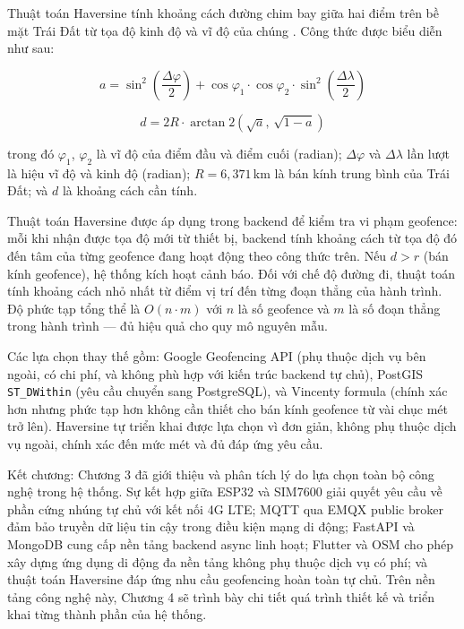 \documentclass[../DoAn.tex]{subfiles}
\begin{document}
Thuật toán Haversine tính khoảng cách đường chim bay giữa hai điểm trên bề mặt Trái Đất từ tọa độ kinh độ và vĩ độ của chúng \cite{haversine_formula}. Công thức được biểu diễn như sau:

\begin{equation}
a = \sin^2\!\left(\frac{\Delta\varphi}{2}\right) + \cos\varphi_1 \cdot \cos\varphi_2 \cdot \sin^2\!\left(\frac{\Delta\lambda}{2}\right)
\label{eq:haversine_a}
\end{equation}

\begin{equation}
d = 2R \cdot \arctan2\!\left(\sqrt{a},\, \sqrt{1-a}\right)
\label{eq:haversine_d}
\end{equation}

\noindent trong đó $\varphi_1$, $\varphi_2$ là vĩ độ của điểm đầu và điểm cuối (radian); $\Delta\varphi$ và $\Delta\lambda$ lần lượt là hiệu vĩ độ và kinh độ (radian); $R = 6{,}371$\,km là bán kính trung bình của Trái Đất; và $d$ là khoảng cách cần tính.

Thuật toán Haversine được áp dụng trong backend để kiểm tra vi phạm geofence: mỗi khi nhận được tọa độ mới từ thiết bị, backend tính khoảng cách từ tọa độ đó đến tâm của từng geofence đang hoạt động theo công thức trên. Nếu $d > r$ (bán kính geofence), hệ thống kích hoạt cảnh báo. Đối với chế độ đường đi, thuật toán tính khoảng cách nhỏ nhất từ điểm vị trí đến từng đoạn thẳng của hành trình. Độ phức tạp tổng thể là $O(n \cdot m)$ với $n$ là số geofence và $m$ là số đoạn thẳng trong hành trình — đủ hiệu quả cho quy mô nguyên mẫu.

Các lựa chọn thay thế gồm: Google Geofencing API (phụ thuộc dịch vụ bên ngoài, có chi phí, và không phù hợp với kiến trúc backend tự chủ), PostGIS \texttt{ST\_DWithin} (yêu cầu chuyển sang PostgreSQL), và Vincenty formula (chính xác hơn nhưng phức tạp hơn không cần thiết cho bán kính geofence từ vài chục mét trở lên). Haversine tự triển khai được lựa chọn vì đơn giản, không phụ thuộc dịch vụ ngoài, chính xác đến mức mét và đủ đáp ứng yêu cầu.

Kết chương: Chương 3 đã giới thiệu và phân tích lý do lựa chọn toàn bộ công nghệ trong hệ thống. Sự kết hợp giữa ESP32 và SIM7600 giải quyết yêu cầu về phần cứng nhúng tự chủ với kết nối 4G LTE; MQTT qua EMQX public broker đảm bảo truyền dữ liệu tin cậy trong điều kiện mạng di động; FastAPI và MongoDB cung cấp nền tảng backend async linh hoạt; Flutter và OSM cho phép xây dựng ứng dụng di động đa nền tảng không phụ thuộc dịch vụ có phí; và thuật toán Haversine đáp ứng nhu cầu geofencing hoàn toàn tự chủ. Trên nền tảng công nghệ này, Chương 4 sẽ trình bày chi tiết quá trình thiết kế và triển khai từng thành phần của hệ thống.
\end{document}
